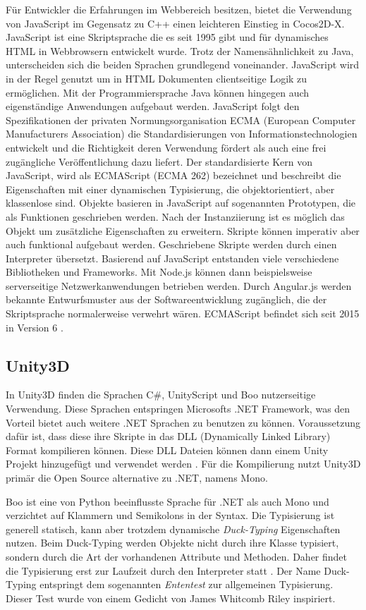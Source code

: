 \bigskip
Für Entwickler die Erfahrungen im Webbereich besitzen, bietet die Verwendung von JavaScript  im Gegensatz zu C++ einen leichteren Einstieg in Cocos2D-X.
JavaScript ist eine Skriptsprache die es seit 1995 gibt und für dynamisches HTML in Webbrowsern entwickelt wurde. Trotz der Namensähnlichkeit zu Java, unterscheiden sich die beiden Sprachen grundlegend voneinander. JavaScript wird in der Regel genutzt um in  HTML Dokumenten clientseitige Logik zu ermöglichen. Mit der Programmiersprache Java können hingegen auch eigenständige Anwendungen aufgebaut werden. JavaScript folgt den Spezifikationen der privaten Normungsorganisation ECMA (European Computer Manufacturers Association) die Standardisierungen von Informationstechnologien entwickelt und die Richtigkeit deren Verwendung fördert als auch eine frei zugängliche Veröffentlichung dazu liefert. Der standardisierte Kern von JavaScript, wird als ECMAScript (ECMA 262) bezeichnet und beschreibt die Eigenschaften mit einer dynamischen Typisierung, die objektorientiert, aber klassenlose sind. Objekte basieren in JavaScript auf sogenannten Prototypen, die als Funktionen geschrieben werden. Nach der Instanziierung ist es möglich das Objekt um zusätzliche Eigenschaften zu erweitern. Skripte können imperativ aber auch funktional aufgebaut werden. Geschriebene Skripte werden durch einen Interpreter übersetzt. Basierend auf JavaScript entstanden viele verschiedene Bibliotheken und Frameworks. Mit Node.js können dann beispielsweise serverseitige Netzwerkanwendungen betrieben werden. Durch Angular.js werden bekannte Entwurfsmuster aus der Softwareentwicklung zugänglich, die der Skriptsprache normalerweise verwehrt wären. ECMAScript befindet sich seit 2015 in Version 6 \citep{learning_javascript}.
 

\subsection{Unity3D}
In Unity3D finden die Sprachen C\#, UnityScript und Boo nutzerseitige Verwendung. Diese Sprachen entspringen Microsofts .NET Framework, was den Vorteil bietet auch weitere .NET Sprachen zu benutzen zu können. Voraussetzung dafür ist, dass diese ihre Skripte in das DLL (Dynamically Linked Library) Format kompilieren können. Diese DLL Dateien können dann einem Unity Projekt hinzugefügt und verwendet werden \citep{unity_managed_plugins}. Für die Kompilierung nutzt Unity3D primär die Open Source alternative zu .NET, namens Mono.

\bigskip
Boo ist eine von Python beeinflusste Sprache für .NET als auch Mono und verzichtet auf Klammern und Semikolons in der Syntax. Die Typisierung ist generell statisch, kann aber trotzdem dynamische \textit{Duck-Typing} Eigenschaften nutzen. Beim Duck-Typing werden Objekte nicht durch ihre Klasse typisiert, sondern durch die Art der vorhandenen Attribute und Methoden. Daher findet die Typisierung erst zur Laufzeit durch den Interpreter statt \citep{boo_about}. Der Name Duck-Typing entspringt dem sogenannten \textit{Ententest} zur allgemeinen Typisierung. Dieser Test wurde von einem Gedicht von James Whitcomb Riley inspiriert.

